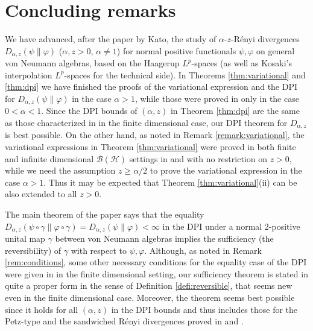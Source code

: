 \documentclass[12pt]{article}
\theoremstyle{definition}
\theoremstyle{remark}
\numberwithin{equation}{section}
\def\ffi{\varphi}
\begin{document}
\section{Concluding remarks}

We have advanced, after the paper \cite{kato2023onrenyi} by Kato, the study of $\alpha$-$z$-R\'enyi
divergences $D_{\alpha,z}(\psi\|\ffi)$ ($\alpha,z>0$, $\alpha\ne1$) for normal positive functionals $\psi,\ffi$
on general von Neumann algebras, based on the Haagerup $L^p$-spaces (as well as Kosaki's
interpolation $L^p$-spaces for the technical side). In Theorems \ref{thm:variational} and \ref{thm:dpi}
we have finished the proofs of the variational expression and the DPI for $D_{\alpha,z}(\psi\|\ffi)$ in the case
$\alpha>1$, while those were proved in \cite{kato2023onrenyi} only in the case $0<\alpha<1$. Since the
DPI bounds of $(\alpha,z)$ in Theorem \ref{thm:dpi} are the same as those characterized in
\cite{zhang2020fromwyd} in the finite dimensional case, our DPI theorem for $D_{\alpha,z}$ is best possible.
On the other hand, as noted in Remark \ref{remark:variational}, the variational expressions in Theorem
\ref{thm:variational} were proved in both finite and infinite dimensional $\mathcal{B}(\mathcal{H})$ settings
in \cite{zhang2020fromwyd} and \cite{mosonyi2023thestrong} with no restriction on $z>0$,
{\color{red}while we need the assumption $z\ge\alpha/2$ to prove the variational expression in the case
$\alpha>1$.} Thus it may be expected that {\color{red}Theorem \ref{thm:variational}(ii)} can be also extended
to all $z>0$.

The main theorem of the paper says that the equality
$D_{\alpha,z}(\psi\circ\gamma\|\ffi\circ\gamma)=D_{\alpha,z}(\psi\|\ffi)<\infty$ in the DPI under a normal
$2$-positive unital map $\gamma$ between von Neumann algebras implies the sufficiency (the reversibility)
of $\gamma$ with respect to $\psi,\ffi$. Although, as noted in Remark \ref{rem:conditions}, some
other necessary conditions for the equality case of the DPI were given in \cite{zhang2020equality}
in the finite dimensional setting, our sufficiency theorem is stated in quite a proper form {\color{red}in the sense
of Definition \ref{defi:reversible}}, that seems new even in the finite dimensional case. Moreover,
the theorem seems best possible since it holds for all $(\alpha,z)$ in the DPI bounds and thus includes
those for the Petz-type and the sandwiched R\'enyi divergences proved in
\cite[Theorem 6.19]{hiai2021quantum} and \cite{jencova2018renyi,jencova2021renyi}.
\end{document}
